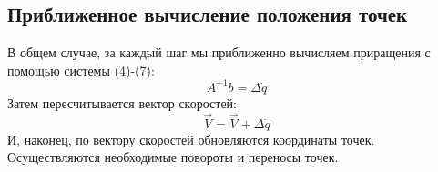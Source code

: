 \subsection{Приближенное вычисление положения точек}
В общем случае, за каждый шаг мы приближенно вычисляем приращения с помощью системы (4)-(7):   
\begin{equation}
A^{-1} b =\Delta\dot {q}
\end{equation}
Затем пересчитывается вектор скоростей:
\begin{equation}
\vec V=\vec V+\Delta\dot{q}
\end{equation}
И, наконец, по вектору скоростей обновляются координаты точек. Осуществляются необходимые повороты и переносы точек.



